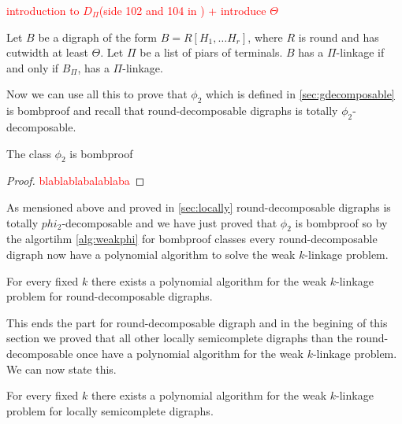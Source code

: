 \textcolor{red}{introduction to $D_{\Pi}$(side 102 and 104 in \cite{bangJGT77}) + introduce $\Theta$}
\begin{lemma}
    Let $B$ be a digraph of the form $B=R[H_1,\dots H_r]$, where $R$ is round and has cutwidth at least $\Theta$. Let $\Pi$ be a list of piars of terminals. $B$ has a $\Pi$-linkage if and only if $B_\Pi$, has a $\Pi$-linkage.
\end{lemma}
Now we can use all this to prove that $\phi_2$ which is defined in \autoref{sec:gdecomposable} is bombproof and recall that round-decomposable digraphs is totally $\phi_2$-decomposable.
\begin{lemma}
    The class $\phi_2$ is bombproof
\end{lemma}
\begin{proof}
    \textcolor{red}{blablablabalablaba}
\end{proof}
As mensioned above and proved in \autoref{sec:locally} round-decomposable digraphs is totally $phi_2$-decomposable and we have just proved that $\phi_2$ is bombproof so by the algortihm \autoref{alg:weakphi} for bombproof classes every round-decomposable digraph now have a polynomial algorithm to solve the weak $k$-linkage problem.
\begin{thm}
    For every fixed $k$ there exists a polynomial algorithm for the weak $k$-linkage problem for round-decomposable digraphs.
\end{thm}
This ends the part for round-decomposable digraph and in the begining of this section we proved that all other locally semicomplete digraphs than the round-decomposable once have a polynomial algorithm for the weak $k$-linkage problem. We can now state this.
\begin{thm}
    For every fixed $k$ there exists a polynomial algorithm for the weak $k$-linkage problem for locally semicomplete digraphs.
\end{thm}